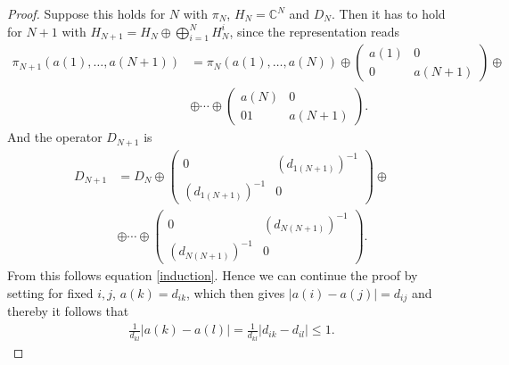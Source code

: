 \begin{proof}
    Suppose this holds for $N$ with $\pi_N$, $H_N = \mathbb{C}^N$ and $D_N$.
    Then it has to hold for $N+1$ with $H_{N+1} = H_{N} \oplus \bigoplus_{i=1}^N
    H_N^i$, since the representation reads
    \begin{align}
        \pi_{N+1}(a(1),\dots,a(N+1)) &= \pi_N(a(1),\dots,a(N))
        \oplus
        \begin{pmatrix}
            a(1) & 0 \\
            0   & a(N+1)
        \end{pmatrix} \oplus \nonumber\\
         &\oplus \cdots \oplus
        \begin{pmatrix}
            a(N) & 0 \\
            0  1 & a(N+1)
        \end{pmatrix}.
    \end{align}
    And the operator $D_{N+1}$ is
    \begin{align}
        D_{N+1} &= D_N
        \oplus
        \begin{pmatrix}
            0 & (d_{1(N+1)})^{-1} \\
            (d_{1(N+1)})^{-1}   & 0
        \end{pmatrix}\oplus \nonumber \\
                &\oplus \cdots \oplus
        \begin{pmatrix}
            0 & (d_{N(N+1)})^{-1} \\
            (d_{N(N+1)})^{-1}   & 0
        \end{pmatrix}.
    \end{align}
    From this follows equation \eqref{induction}.
    Hence we can continue the proof by setting for fixed $i, j$, $a(k) =
    d_{ik}$, which then gives $|a(i) - a(j)| = d_{ij}$ and thereby it follows
    that
    \begin{align}
        \frac{1}{d_{kl}} \big| a(k) - a(l) \big| =  \frac{1}{d_{kl}} \big|
        d_{ik} - d_{il} \big| \leq 1.
    \end{align}
\end{proof}

